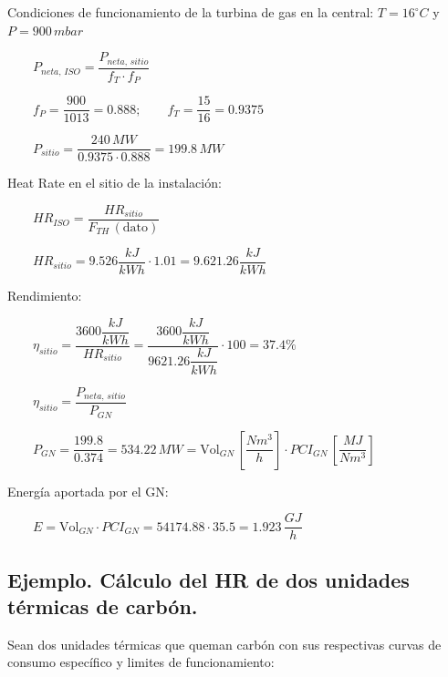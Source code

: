 			
			Condiciones de funcionamiento de la turbina de gas en la central: $T=16^\circ C$ y $P=900\,mbar$
			
			$\qquad P_{neta,\,ISO} = \dfrac{P_{neta,\,sitio}}{f_T \cdot f_P}$
			
			$\qquad f_P = \dfrac{900}{1013} = 0.888;\quad\quad f_T = \dfrac{15}{16} = 0.9375$
			
			$\qquad P_{sitio} = \dfrac{240\,MW}{0.9375 \cdot 0.888} = 199.8\,MW$
			
			\vspace{0.25cm}
			Heat Rate en el sitio de la instalación:
			
			\vspace{0.2cm}
			$\qquad H\!R_{ISO} = \dfrac{H\!R_{sitio}}{F_{TH}\,(\text{dato})}$
			
			$\qquad H\!R_{sitio} = 9.526 \dfrac{kJ}{kWh}\cdot 1.01 = 9.621.26 \dfrac{kJ}{kWh}$
			
			\vspace{0.25cm}
			Rendimiento:
			
			\vspace{0.2cm}
			$\qquad \eta_{sitio} = \dfrac{3600 \dfrac{kJ}{kWh}}{H\!R_{sitio}} =
				\dfrac{3600 \dfrac{kJ}{kWh}}{9621.26 \dfrac{kJ}{kWh}} \cdot 100 = 37.4\%$
				
			$\qquad \eta_{sitio} = \dfrac{P_{neta,\,sitio}}{P_{GN}}$
			
			$\qquad P_{GN} = \dfrac{199.8}{0.374} = 534.22\,MW = \text{Vol}_{GN}\,\left[\dfrac{Nm^3}{h}\right] \cdot PCI_{GN}\,\left[\dfrac{MJ}{Nm^3}\right]$
			
			\vspace{0.25cm}
			Energía aportada por el GN:
			
			$\qquad E = \text{Vol}_{GN} \cdot PCI_{GN} = 54174.88 \cdot 35.5 = 1.923\,\dfrac{GJ}{h}$
	
			\newpage
			
		\subsection*{Ejemplo. Cálculo del HR de dos unidades térmicas de carbón.}
			Sean dos unidades térmicas que queman carbón con sus respectivas curvas de consumo
			específico y limites de funcionamiento:
			
